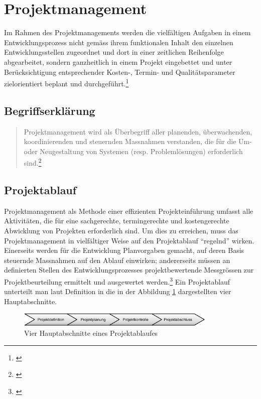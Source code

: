 \section{Projektmanagement}
Im Rahmen des Projektmanagements werden die vielfältigen Aufgaben in einem
Entwicklungsprozess nicht gemäss ihrem funktionalen Inhalt den einzelnen 
Entwicklungsstellen zugeordnet und dort in einer zeitlichen Reihenfolge 
abgearbeitet, sondern ganzheitlich in einem Projekt eingebettet und unter
Berücksichtigung entsprechender Kosten-, Termin- und Qualitätsparameter 
zielorientiert beplant und durchgeführt.\footnote{\citealp*[Vgl.][S. 9]{burghardt2007einfuehrung}}

\subsection{Begriffserklärung}
\begin{quote}
Projektmanagement wird als Überbegriff aller planenden, überwachenden,
koordinierenden und steuernden Massnahmen verstanden, die für die Um- oder
Neugestaltung von Systemen (resp. Problemlösungen) erforderlich sind.\footnote{\citealp*[Vgl.][S. 1.1]{stiftung1998projekt}}
\end{quote}

\subsection{Projektablauf}
Projektmanagement als Methode einer effizienten Projekteinführung umfasst alle
Aktivitäten, die für eine sachgerechte, termingerechte und kostengerechte
Abwicklung von Projekten erforderlich sind. Um dies zu erreichen, muss das
Projektmanagement in vielfältiger Weise auf den Projektablauf ``regelnd''
wirken. Einerseits werden für die Entwicklung Planvorgaben gemacht, auf deren 
Basis steuernde Massnahmen auf den Ablauf einwirken; andererseits müssen an
definierten Stellen des Entwicklungsprozesses projektbewertende Messgrössen zur
Projektbeurteilung ermittelt und ausgewertet werden.\footnote{\citealp*[Vgl.][S. 11]{burghardt2007einfuehrung}}
Ein Projektablauf unterteilt man laut Definition in die in der Abbildung \ref{pic:01_hauptabschnitte}
dargestellten vier Hauptabschnitte.

\begin{figure}[htbp]
\begin{center}
\includegraphics[width=0.85\textwidth,angle=0]{./bilder/theorie/01_hauptabschnitte.pdf}
\caption{Vier Hauptabschnitte eines Projektablaufes}
\label{pic:01_hauptabschnitte}
\end{center}
\end{figure}

